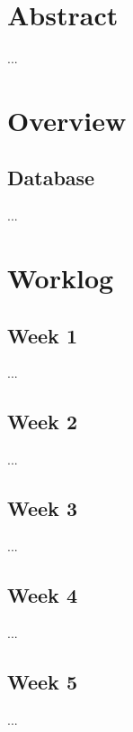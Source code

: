 \documentclass[12pt]{article}
\begin{document}


\tableofcontents

\section{Abstract}
...

\section{Overview}
\subsection{Database}
...

\section{Worklog}
\subsection{Week 1}
...
\subsection{Week 2}
...
\subsection{Week 3}
...
\subsection{Week 4}
...
\subsection{Week 5}
...
\end{document}
